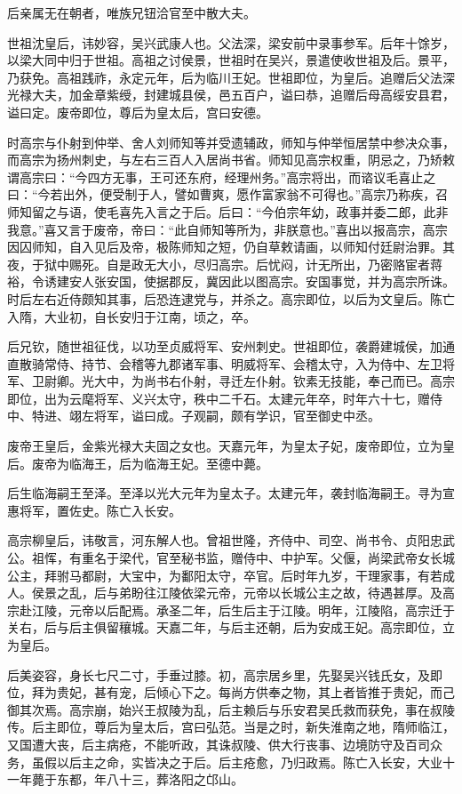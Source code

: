 \documentclass[]{article}
\begin{document}
后亲属无在朝者，唯族兄钮洽官至中散大夫。

世祖沈皇后，讳妙容，吴兴武康人也。父法深，梁安前中录事参军。后年十馀岁，以梁大同中归于世祖。高祖之讨侯景，世祖时在吴兴，景遣使收世祖及后。景平，乃获免。高祖践祚，永定元年，后为临川王妃。世祖即位，为皇后。追赠后父法深光禄大夫，加金章紫绶，封建城县侯，邑五百户，谥曰恭，追赠后母高绥安县君，谥曰定。废帝即位，尊后为皇太后，宫曰安德。

时高宗与仆射到仲举、舍人刘师知等并受遗辅政，师知与仲举恒居禁中参决众事，而高宗为扬州刺史，与左右三百人入居尚书省。师知见高宗权重，阴忌之，乃矫敕谓高宗曰：``今四方无事，王可还东府，经理州务。''高宗将出，而谘议毛喜止之曰：``今若出外，便受制于人，譬如曹爽，愿作富家翁不可得也。''高宗乃称疾，召师知留之与语，使毛喜先入言之于后。后曰：``今伯宗年幼，政事并委二郎，此非我意。''喜又言于废帝，帝曰：``此自师知等所为，非朕意也。''喜出以报高宗，高宗因囚师知，自入见后及帝，极陈师知之短，仍自草敕请画，以师知付廷尉治罪。其夜，于狱中赐死。自是政无大小，尽归高宗。后忧闷，计无所出，乃密赂宦者蒋裕，令诱建安人张安国，使据郡反，冀因此以图高宗。安国事觉，并为高宗所诛。时后左右近侍颇知其事，后恐连逮党与，并杀之。高宗即位，以后为文皇后。陈亡入隋，大业初，自长安归于江南，顷之，卒。

后兄钦，随世祖征伐，以功至贞威将军、安州刺史。世祖即位，袭爵建城侯，加通直散骑常侍、持节、会稽等九郡诸军事、明威将军、会稽太守，入为侍中、左卫将军、卫尉卿。光大中，为尚书右仆射，寻迁左仆射。钦素无技能，奉己而已。高宗即位，出为云麾将军、义兴太守，秩中二千石。太建元年卒，时年六十七，赠侍中、特进、翊左将军，谥曰成。子观嗣，颇有学识，官至御史中丞。

废帝王皇后，金紫光禄大夫固之女也。天嘉元年，为皇太子妃，废帝即位，立为皇后。废帝为临海王，后为临海王妃。至德中薨。

后生临海嗣王至泽。至泽以光大元年为皇太子。太建元年，袭封临海嗣王。寻为宣惠将军，置佐史。陈亡入长安。

高宗柳皇后，讳敬言，河东解人也。曾祖世隆，齐侍中、司空、尚书令、贞阳忠武公。祖恽，有重名于梁代，官至秘书监，赠侍中、中护军。父偃，尚梁武帝女长城公主，拜驸马都尉，大宝中，为鄱阳太守，卒官。后时年九岁，干理家事，有若成人。侯景之乱，后与弟盼往江陵依梁元帝，元帝以长城公主之故，待遇甚厚。及高宗赴江陵，元帝以后配焉。承圣二年，后生后主于江陵。明年，江陵陷，高宗迁于关右，后与后主俱留穰城。天嘉二年，与后主还朝，后为安成王妃。高宗即位，立为皇后。

后美姿容，身长七尺二寸，手垂过膝。初，高宗居乡里，先娶吴兴钱氏女，及即位，拜为贵妃，甚有宠，后倾心下之。每尚方供奉之物，其上者皆推于贵妃，而己御其次焉。高宗崩，始兴王叔陵为乱，后主赖后与乐安君吴氏救而获免，事在叔陵传。后主即位，尊后为皇太后，宫曰弘范。当是之时，新失淮南之地，隋师临江，又国遭大丧，后主病疮，不能听政，其诛叔陵、供大行丧事、边境防守及百司众务，虽假以后主之命，实皆决之于后。后主疮愈，乃归政焉。陈亡入长安，大业十一年薨于东都，年八十三，葬洛阳之邙山。
\end{document}
